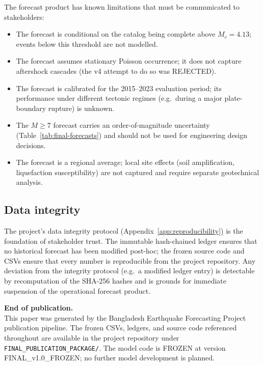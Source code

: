 \documentclass[10pt,a4paper,twocolumn]{article}
\begin{document}
The forecast product has known limitations that must be communicated to stakeholders:

\begin{itemize}[leftmargin=1.2em,itemsep=2pt,topsep=2pt]
\item The forecast is conditional on the catalog being complete above $M_c=4.13$; events below this threshold are not modelled.
\item The forecast assumes stationary Poisson occurrence; it does not capture aftershock cascades (the v4 attempt to do so was REJECTED).
\item The forecast is calibrated for the 2015--2023 evaluation period; its performance under different tectonic regimes (e.g.\ during a major plate-boundary rupture) is unknown.
\item The $M\geq7$ forecast carries an order-of-magnitude uncertainty (Table~\ref{tab:final-forecasts}) and should not be used for engineering design decisions.
\item The forecast is a regional average; local site effects (soil amplification, liquefaction susceptibility) are not captured and require separate geotechnical analysis.
\end{itemize}

\subsection{Data integrity}

The project's data integrity protocol (Appendix~\ref{app:reproducibility}) is the foundation of stakeholder trust. The immutable hash-chained ledger ensures that no historical forecast has been modified post-hoc; the frozen source code and CSVs ensure that every number is reproducible from the project repository. Any deviation from the integrity protocol (e.g.\ a modified ledger entry) is detectable by recomputation of the SHA-256 hashes and is grounds for immediate suspension of the operational forecast product.

\vspace{1.0em}
\noindent\textbf{\color{accent} End of publication.}\\
{\small This paper was generated by the Bangladesh Earthquake Forecasting Project publication pipeline. The frozen CSVs, ledgers, and source code referenced throughout are available in the project repository under \texttt{FINAL\_PUBLICATION\_PACKAGE/}. The model code is FROZEN at version FINAL\_v1.0\_FROZEN; no further model development is planned.}
\end{document}
